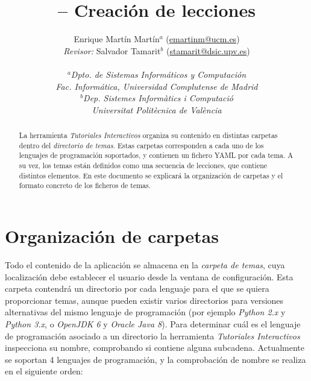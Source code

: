 \documentclass[]{article}
\title{\toolname{} -- Creación de lecciones}
\author{Enrique Martín Martín$^a$ (\url{emartinm@ucm.es}) \\ \emph{Revisor:} Salvador Tamarit$^b$ (\url{stamarit@dsic.upv.es})\\~\\[-.4cm]
	\normalsize{\emph{$^a$Dpto. de Sistemas Informáticos y Computación}}\\[-0.1cm]
	\normalsize{\emph{Fac. Informática, Universidad Complutense de Madrid}}\\[-0.1cm]
	\normalsize{\emph{$^b$Dep. Sistemes Informàtics i Computació}}\\[-0.1cm]
	\normalsize{\emph{Universitat Politècnica de València}}\\[-0.1cm]
}
\newcommand{\toolname}{\emph{Tutoriales Interactivos}}
\begin{document}
\maketitle

\begin{abstract}
La herramienta \toolname{} organiza su contenido en distintas carpetas dentro del \emph{directorio de temas}. Estas carpetas corresponden a cada uno de los lenguajes de programación soportados, y contienen un fichero YAML por cada tema. A su vez, los temas están definidos como una secuencia de lecciones, que contiene distintos elementos. En este documento se explicará la organización de carpetas y el formato concreto de los ficheros de temas.
\end{abstract}

\tableofcontents

\clearpage


\section{Organización de carpetas}
Todo el contenido de la aplicación se almacena en la \emph{carpeta de temas}, cuya localización debe establecer el usuario desde la ventana de configuración. Esta carpeta contendrá un directorio por cada lenguaje para el que se quiera proporcionar temas, aunque pueden existir varios directorios para versiones alternativas del mismo lenguaje de programación (por ejemplo \emph{Python 2.x} y \emph{Python 3.x}, o \emph{OpenJDK 6} y \emph{Oracle Java 8}). Para determinar cuál es el lenguaje de programación asociado a un directorio la herramienta \toolname{} inspecciona su nombre, comprobando si contiene alguna subcadena. Actualmente se soportan 4 lenguajes de programación, y la comprobación de nombre se realiza en el siguiente orden:
\end{document}
